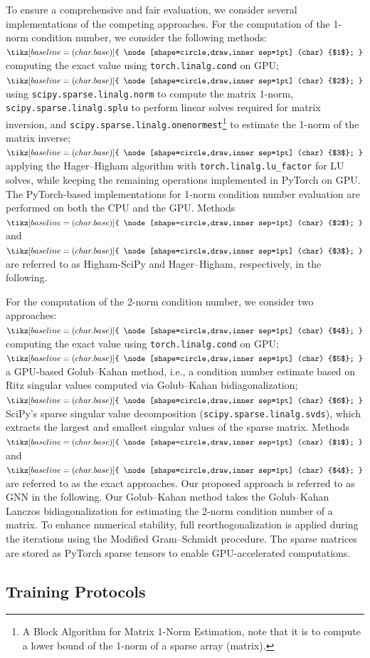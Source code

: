 \documentclass[11pt,a4paper]{article}
\theoremstyle{plain}
\theoremstyle{definition}
\theoremstyle{remark}
\newcommand{\mathcircled}[1]{%
    \tikz[baseline=(char.base)]{
        \node[shape=circle,draw,inner sep=1pt] (char) {$#1$};
    }%
}
\begin{document}
To ensure a comprehensive and fair evaluation, we consider several implementations of the competing approaches. For the computation of the 1-norm condition number, we consider the following methods:
$\mathcircled{1}$ computing the exact value using \texttt{torch.linalg.cond} on GPU;
$\mathcircled{2}$ using \texttt{scipy.sparse.linalg.norm} to compute the matrix 1-norm, \texttt{scipy.sparse.linalg.splu} to perform linear solves required for matrix inversion, and \texttt{scipy.sparse.linalg.onenormest}\footnote{A Block Algorithm for Matrix 1-Norm Estimation, note that it is to compute a lower bound of the 1-norm of a sparse array (matrix).} to estimate the 1-norm of the matrix inverse; $\mathcircled{3}$ applying the Hager–Higham algorithm with \texttt{torch.linalg.lu\_factor} for LU solves, while keeping the remaining operations implemented in PyTorch on GPU. The PyTorch-based implementations for 1-norm condition number evaluation are performed on both the CPU and the GPU.  Methods $\mathcircled{2}$ and $\mathcircled{3}$ are referred to as Higham-SciPy and Hager–Higham, respectively, in the following.

For the computation of the 2-norm condition number, we consider two approaches: $\mathcircled{4}$ computing the exact value using \texttt{torch.linalg.cond} on GPU; $\mathcircled{5}$ a GPU-based Golub–Kahan method, i.e., a condition number estimate based on Ritz singular values computed via Golub–Kahan bidiagonalization; $\mathcircled{6}$ SciPy's sparse singular value decomposition (\texttt{scipy.sparse.linalg.svds}), which extracts the largest and smallest singular values of the sparse matrix. Methods $\mathcircled{1}$ and $\mathcircled{4}$ are referred to as the exact approaches.  Our proposed approach is referred to as GNN in the following. Our Golub–Kahan method takes the Golub–Kahan Lanczos bidiagonalization for estimating the 2-norm condition number of a matrix. To enhance numerical stability, full reorthogonalization is applied during the iterations using the Modified Gram–Schmidt procedure. The sparse matrices are stored as PyTorch sparse tensors to enable GPU-accelerated computations.




 




\subsection{Training Protocols}
\end{document}
